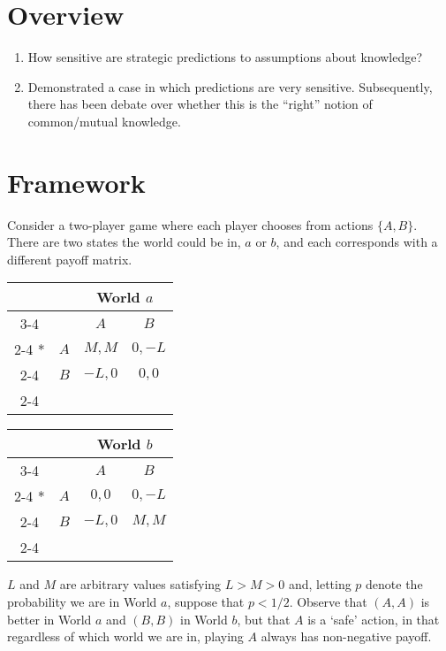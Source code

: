  {}

\section*{Overview}
\begin{enumerate}
	\item How sensitive are strategic predictions to assumptions about knowledge?
	\item Demonstrated a case in which predictions are very sensitive.  Subsequently, there has been debate over whether this is the ``right'' notion of common/mutual knowledge.
\end{enumerate}

\section*{Framework}


Consider a two-player game where each player chooses from actions $\{A,B\}$.  There are two states the world could be in, $a$ or $b$, and each corresponds with a different payoff matrix.

 \begin{table}[H]
 	\centering
	\setlength{\extrarowheight}{2pt}
	\begin{tabular}{*{4}{c|}}
		\multicolumn{2}{c}{} & \multicolumn{2}{c}{World $a$}\\\cline{3-4}
		\multicolumn{1}{c}{} &  & $A$  & $B$ \\\cline{2-4}
		\multirow{2}*{}  & $A$ & $M,M$ & $0,-L$ \\\cline{2-4}
		& $B$ & $-L,0$ & $0,0$ \\\cline{2-4}
	\end{tabular}
	\begin{tabular}{*{4}{c|}}
	\multicolumn{2}{c}{} & \multicolumn{2}{c}{World $b$}\\\cline{3-4}
	\multicolumn{1}{c}{} &  & $A$  & $B$ \\\cline{2-4}
	\multirow{2}*{}  & $A$ & $0,0$ & $0,-L$ \\\cline{2-4}
	& $B$ & $-L,0$ & $M,M$ \\\cline{2-4}
\end{tabular}
\end{table}

$L$ and $M$ are arbitrary values satisfying $L>M>0$ and, letting $p$ denote the probability we are in World $a$, suppose that $p<1/2$.  Observe that $(A,A)$ is better in World $a$ and $(B,B)$ in World $b$, but that $A$ is a `safe' action, in that regardless of which world we are in, playing $A$ always has non-negative payoff.

